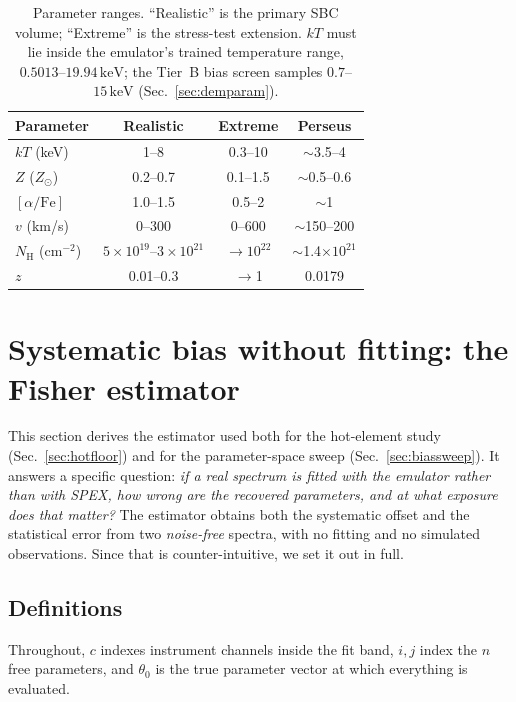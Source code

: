 \documentclass[11pt,a4paper]{article}
\newcommand{\nh}{N_{\mathrm{H}}}
\newcommand{\kev}{\,\mathrm{keV}}
\newcommand{\zsun}{Z_\odot}
\begin{document}
\begin{table}[t]
\centering
\caption{Parameter ranges. ``Realistic'' is the primary SBC volume; ``Extreme''
is the stress-test extension. $kT$ must lie inside the emulator's trained
temperature range, $0.5013$--$19.94\kev$; the Tier~B bias screen samples
$0.7$--$15\kev$ (Sec.~\ref{sec:demparam}).}
\label{tab:ranges}
\begin{tabular}{lccc}
\toprule
Parameter & Realistic & Extreme & Perseus \\
\midrule
$kT$ (keV)        & 1--8       & 0.3--10   & $\sim$3.5--4 \\
$Z$ ($\zsun$)     & 0.2--0.7   & 0.1--1.5  & $\sim$0.5--0.6 \\
$[\alpha/\mathrm{Fe}]$ & 1.0--1.5 & 0.5--2 & $\sim$1 \\
$v$ (km/s)        & 0--300     & 0--600    & $\sim$150--200 \\
$\nh$ (cm$^{-2}$) & $5{\times}10^{19}$--$3{\times}10^{21}$ & $\to10^{22}$ & $\sim$1.4$\times10^{21}$ \\
$z$               & 0.01--0.3  & $\to$1    & 0.0179 \\
\bottomrule
\end{tabular}
\end{table}

\section{Systematic bias without fitting: the Fisher estimator}\label{sec:fisherbias}
This section derives the estimator used both for the hot-element study
(Sec.~\ref{sec:hotfloor}) and for the parameter-space sweep
(Sec.~\ref{sec:biassweep}). It answers a specific question: \emph{if a real
spectrum is fitted with the emulator rather than with SPEX, how wrong are the
recovered parameters, and at what exposure does that matter?} The estimator
obtains both the systematic offset and the statistical error from two
\emph{noise-free} spectra, with no fitting and no simulated observations. Since
that is counter-intuitive, we set it out in full.

\subsection{Definitions}
Throughout, $c$ indexes instrument channels inside the fit band, $i,j$ index the
$n$ free parameters, and $\theta_0$ is the true parameter vector at which
everything is evaluated.
\end{document}
